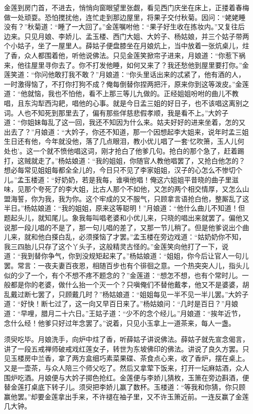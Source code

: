 金莲到房门首，不进去，悄悄向窗眼望里张觑，看见西门庆坐在床上，正搂着春梅做一处顽耍。恐怕搅扰他，连忙走到那边屋里，将果子交付秋菊。因问：“姥姥睡没有？”秋菊道：“睡了一大回了。”金莲嘱咐他：“果子好生收在拣妆内。”又复往后边来。只见月娘、李娇儿、孟玉楼、西门大姐、大妗子、杨姑娘，并三个姑子带两个小姑子，坐了一屋里人。薛姑子便盘膝坐在月娘炕上，当中放着一张炕桌儿，炷了香，众人都围着他，听他说佛法。只见金莲笑掀帘子进来，月娘道：“你惹下祸来，他往屋里寻你去了。你不打发他睡，如何又来了？我还愁他到屋里要打你。”金莲笑道：“你问他敢打我不敢？”月娘道：“你头里话出来的忒紧了，他有酒的人，一时激得恼了，不打你打狗不成？俺每倒替你捏两把汗，原来你到这等泼皮。”金莲道：“他就恼，我也不怕他，看不上那三等儿九做的。正经姐姐吩咐的曲儿不教唱，且东沟犁西沟耙，唱他的心事。就是今日孟三姐的好日子，也不该唱这离别之词。人也不知死到那里去了，偏有那些佯慈悲假孝顺，我是看不上。”大妗子道：“你姐妹每乱了这一回，我还不知因为什么来。姑夫好好的进来坐着，怎的又出去了？”月娘道：“大妗子，你还不知道，那一个因想起李大姐来，说年时孟三姐生日还有他，今年就没他，落了几点眼泪，教小优儿唱了一套‘忆吹箫，玉人儿何处也’。这一个就不愤他唱这词，刚才抢白了他爹几句。抢白的那个急了，赶着踢打，这贼就走了。”杨姑娘道：“我的姐姐，你随官人教他唱罢了，又抢白他怎的？想必每常见姐姐每都全全儿的，今日只不见了李家姐姐，汉子的心怎么不惨切个儿。”孟玉楼道：“好奶奶，若是我每，谁嗔他唱！俺这六姐姐平昔晓的曲子里滋味，见那个夸死了的李大姐，比古人那个不如他，又怎的两个相交情厚，又怎么山盟海誓，你为我，我为你。这个牢成的又不服气，只顾拿言语抢白他，整厮乱了这半日。”杨姑娘道：“我的姐姐，原来这等聪明！”月娘道：“他什么曲儿不知道！但题起头儿，就知尾儿。象我每叫唱老婆和小优儿来，只晓的唱出来就罢了。偏他又说那一段儿唱的不是了，那一句儿唱的差了，又那一节儿稍了。但是他爹说出个曲儿来，就和他白搽白乱，必须搽恼了才罢。”孟玉楼在旁边戏道：“姑奶奶你不知，我三四胎儿只存了这个丫头子，这般精灵古怪的。”金莲笑向他打了一下，说道：“我到替你争气，你到没规矩起来了。”杨姑娘道：“姐姐，你今后让官人一句儿罢。常言：一夜夫妻百夜恩，相随百步也有个徘徊之意。一个热突突人儿，指头儿似的少了一个，有个不想不疼不题念的？”金莲道：“想怎不想，也有个常时儿。一般都是你的老婆，做什么抬一个灭一个？只嗔俺们不替他戴孝，他又不是婆婆，胡乱戴过断七罢了，只顾戴几时？”杨姑娘道：“姐姐每见一半不见一半儿罢。”大妗子道：“好快！断七过了，这一向又早百日来了。”杨姑娘问：“几时是百日？”月娘道：“早哩，腊月二十六日。”王姑子道：“少不的念个经儿。”月娘道：“挨年近节，念什么经！他爹只好过年念罢了。”说着，只见小玉拿上一道茶来，每人一盏。

须臾吃毕。月娘洗手，向炉中炷了香，听薛姑子讲说佛法。薛姑子就先宣念偈言，讲了一段五戒禅师破戒戏红莲女子，转世为东坡佛印的佛法。讲说了良久方罢。只见玉楼房中兰香，拿了两方盒细巧素菜果碟、茶食点心来，收了香炉，摆在桌上。又是一壶茶，与众人陪三个师父吃了。然后又拿荤下饭来，打开一坛麻姑酒，众人围炉吃酒。月娘便与大妗子掷色抢红。金莲便与李娇儿猜枚，玉箫在旁边斟酒，便替金莲打桌底下转子儿。须臾把李娇儿赢了数杯。玉楼道：“等我和你猜，你只顾赢他罢。”却要金莲拿出手来，不许褪在袖子里，又不许玉箫近前。一连反赢了金莲几大钟。

